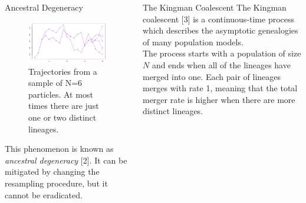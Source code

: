 \documentclass[final, 12pt]{beamer}
\newlength{\colwidth}
\begin{document}
\begin{frame}
\begin{columns}
\begin{column}{\colwidth}
\begin{block}{Ancestral Degeneracy}
\begin{figure} %
\includegraphics[width=0.9\colwidth]{../degeneracy.pdf}
\caption{Trajectories from a sample of N=6 particles. At most times there are just one or two distinct lineages.}
\end{figure}

This phenomenon is known as \emph{ancestral degeneracy} [2]. It can be mitigated by changing the resampling procedure, but it cannot be eradicated.
\end{block}
\end{column}

\begin{column}{\colwidth}

\vspace*{-75pt}

\begin{block}{The Kingman Coalescent}
The Kingman coalescent [3] is a continuous-time process which describes the asymptotic genealogies of many population models.\\[10pt]

The process starts with a population of size $N$ and ends when all of the lineages have merged into one.
Each pair of lineages merges with rate 1, meaning that the total merger rate is higher when there are more distinct lineages.\\[10pt]


\end{block}
\end{column}
\end{columns}
\end{frame}
\end{document}
